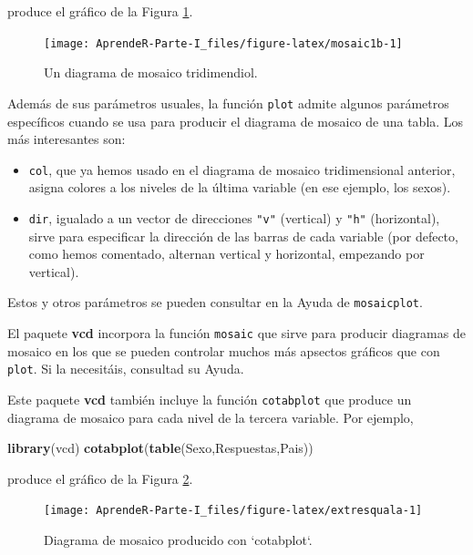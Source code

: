 \documentclass[]{book}
\newenvironment{Shaded}{\begin{snugshade}}{\end{snugshade}}
\newcommand{\KeywordTok}[1]{\textcolor[rgb]{0.13,0.29,0.53}{\textbf{#1}}}
\newcommand{\NormalTok}[1]{#1}
\providecommand{\tightlist}{%
  \setlength{\itemsep}{0pt}\setlength{\parskip}{0pt}}
\theoremstyle{definition}
\theoremstyle{definition}
\theoremstyle{definition}
\theoremstyle{remark}
\begin{document}
produce el gráfico de la Figura \ref{fig:mosaic1b}.

\begin{figure}

{\centering \texttt{[image: AprendeR-Parte-I\_files/figure-latex/mosaic1b-1]} 

}

\caption{Un diagrama de mosaico tridimendiol.}\label{fig:mosaic1b}
\end{figure}

Además de sus parámetros usuales, la función \texttt{plot} admite algunos parámetros específicos
cuando se usa para producir el diagrama de mosaico de una tabla. Los más interesantes son:

\begin{itemize}
\tightlist
\item
  \texttt{col}, que ya hemos usado en el diagrama de mosaico tridimensional anterior, asigna colores a los niveles de la última variable (en ese ejemplo, los sexos).
\item
  \texttt{dir}, igualado a un vector de direcciones \texttt{"v"} (vertical) y \texttt{"h"} (horizontal), sirve para especificar la dirección de las barras de cada variable (por defecto, como hemos comentado, alternan vertical y horizontal, empezando por vertical).
\end{itemize}

Estos y otros parámetros se pueden consultar en la Ayuda de \texttt{mosaicplot}.

El paquete \textbf{vcd} incorpora la función \texttt{mosaic} que sirve para producir diagramas de mosaico en los que se pueden controlar muchos más apsectos gráficos que con \texttt{plot}. Si la necesitáis, consultad su Ayuda.

Este paquete \textbf{vcd} también incluye la función \texttt{cotabplot} que produce un diagrama de mosaico para cada nivel de la tercera variable. Por ejemplo,

\begin{Shaded}
\begin{Highlighting}[]
\KeywordTok{library}\NormalTok{(vcd)}
\KeywordTok{cotabplot}\NormalTok{(}\KeywordTok{table}\NormalTok{(Sexo,Respuestas,Pais))}
\end{Highlighting}
\end{Shaded}

produce el gráfico de la Figura \ref{fig:extresquala}.

\begin{figure}

{\centering \texttt{[image: AprendeR-Parte-I\_files/figure-latex/extresquala-1]} 

}

\caption{Diagrama de mosaico producido con `cotabplot`.}\label{fig:extresquala}
\end{figure}
\end{document}
